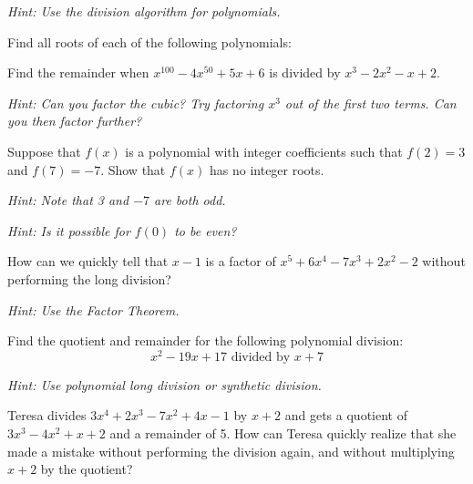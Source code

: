 \documentclass[12pt]{exam}
\begin{document}
\begin{questions}
\textit{Hint: Use the division algorithm for polynomials.}
\vspace*{4cm}

\question[8]
Find all roots of each of the following polynomials:

\newpage

\question[10]
Find the remainder when $x^{100} - 4x^{50} + 5x + 6$ is divided by $x^3 - 2x^2 - x + 2$.

\textit{Hint: Can you factor the cubic? Try factoring $x^3$ out of the first two terms. Can you then factor further?}
\vspace*{5cm}

\question[8]
Suppose that $f(x)$ is a polynomial with integer coefficients such that $f(2) = 3$ and $f(7) = -7$. Show that $f(x)$ has no integer roots.

\textit{Hint: Note that 3 and $-7$ are both odd.}

\textit{Hint: Is it possible for $f(0)$ to be even?}
\vspace*{4cm}

\newpage

\question[8]
How can we quickly tell that $x - 1$ is a factor of $x^5 + 6x^4 - 7x^3 + 2x^2 - 2$ without performing the long division?

\textit{Hint: Use the Factor Theorem.}
\vspace*{3cm}

\question[10]
Find the quotient and remainder for the following polynomial division:
$$x^2 - 19x + 17 \text{ divided by } x + 7$$

\textit{Hint: Use polynomial long division or synthetic division.}
\vspace*{4cm}

\question[12]
Teresa divides $3x^4 + 2x^3 - 7x^2 + 4x - 1$ by $x + 2$ and gets a quotient of $3x^3 - 4x^2 + x + 2$ and a remainder of 5. How can Teresa quickly realize that she made a mistake without performing the division again, and without multiplying $x + 2$ by the quotient?


\end{questions}
\end{document}
